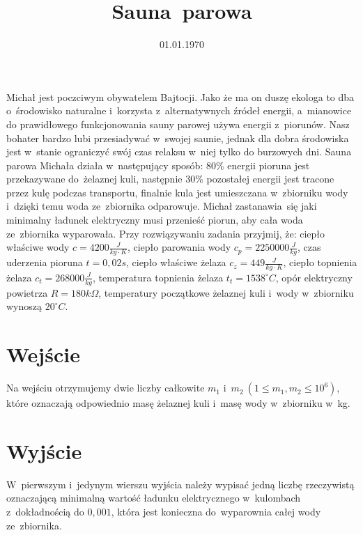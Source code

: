 \documentclass[zad]{soigstyl}
\date{01.01.1970}
\title{\mbox{Sauna parowa}}
\begin{document}
\begin{tasktext}%
    \noindent
    Michał jest poczciwym obywatelem Bajtocji. Jako że ma on duszę ekologa to dba o~środowisko naturalne i~korzysta z~alternatywnych źródeł energii, a~mianowice do prawidłowego funkcjonowania sauny parowej używa energii z~piorunów. Nasz bohater bardzo lubi przesiadywać w~swojej saunie, jednak dla dobra środowiska jest w~stanie ograniczyć swój czas relaksu w~niej tylko do burzowych dni. Sauna parowa Michała działa w~następujący sposób: $80\%$ energii pioruna jest przekazywane do~żelaznej kuli, następnie $30\%$ pozostałej energii jest tracone przez kulę podczas transportu, finalnie kula jest umieszczana w~zbiorniku wody i~dzięki temu woda ze~zbiornika odparowuje. Michał zastanawia~się jaki minimalny ładunek elektryczny musi przenieść piorun, aby cała woda ze~zbiornika wyparowała. Przy rozwiązywaniu zadania przyjmij, że: ciepło właściwe wody $c=4200\frac{J}{kg \cdot K}$, ciepło parowania wody $c_p=2250000\frac{J}{kg}$, czas uderzenia pioruna $t=0,02s$, ciepło właściwe żelaza $c_z=449\frac{J}{kg \cdot K}$, ciepło topnienia żelaza $c_t=268000\frac{J}{kg}$, temperatura topnienia żelaza $t_t=1538^{\circ}C$, opór elektryczny powietrza $R=180k\Omega$, temperatury początkowe żelaznej kuli i~wody w~zbiorniku wynoszą $20^{\circ}C$.
	
    	\section{Wejście}
	Na wejściu otrzymujemy dwie liczby całkowite $m_1$ i~$m_2~(1 \leqslant m_1, m_2 \leqslant 10^6)$, które oznaczają odpowiednio masę żelaznej kuli i~masę wody w~zbiorniku w~kg.

	\section{Wyjście}
	W~pierwszym i~jedynym wierszu wyjścia należy wypisać jedną liczbę rzeczywistą oznaczającą minimalną wartość ładunku elektrycznego w~kulombach z~dokładnością do $0,001$, która jest konieczna do~wyparownia całej wody ze~zbiornika.
	
	\oigprzyklady
\end{tasktext}
\end{document}
